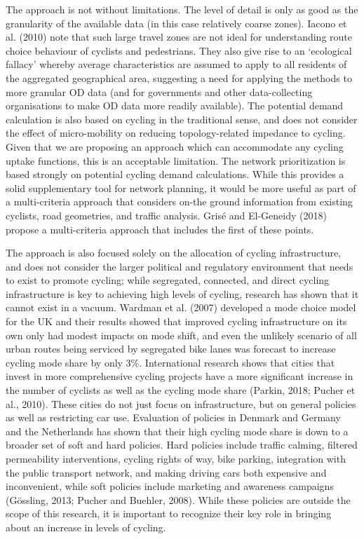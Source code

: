 \documentclass[
]{article}
\begin{document}
The approach is not without limitations.
The level of detail is only as good as the granularity of the available data (in this case relatively coarse zones).
Iacono et al. (2010) note that such large travel zones are not ideal for understanding route choice behaviour of cyclists and pedestrians.
They also give rise to an `ecological fallacy' whereby average characteristics are assumed to apply to all residents of the aggregated geographical area, suggesting a need for applying the methods to more granular OD data (and for governments and other data-collecting organisations to make OD data more readily available).
The potential demand calculation is also based on cycling in the traditional sense, and does not consider the effect of micro-mobility on reducing topology-related impedance to cycling.
Given that we are proposing an approach which can accommodate any cycling uptake functions, this is an acceptable limitation.
The network prioritization is based strongly on potential cycling demand calculations. While this provides a solid supplementary tool for network planning, it would be more useful as part of a multi-criteria approach that considers on-the ground information from existing cyclists, road geometries, and traffic analysis. Grisé and El-Geneidy (2018) propose a multi-criteria approach that includes the first of these points.

The approach is also focused solely on the allocation of cycling infrastructure, and does not consider the larger political and regulatory environment that needs to exist to promote cycling; while segregated, connected, and direct cycling infrastructure is key to achieving high levels of cycling, research has shown that it cannot exist in a vacuum.
Wardman et al. (2007) developed a mode choice model for the UK and their results showed that improved cycling infrastructure on its own only had modest impacts on mode shift, and even the unlikely scenario of all urban routes being serviced by segregated bike lanes was forecast to increase cycling mode share by only 3\%.
International research shows that cities that invest in more comprehensive cycling projects have a more significant increase in the number of cyclists as well as the cycling mode share (Parkin, 2018; Pucher et al., 2010).
These cities do not just focus on infrastructure, but on general policies as well as restricting car use.
Evaluation of policies in Denmark and Germany and the Netherlands has shown that their high cycling mode share is down to a broader set of soft and hard policies.
Hard policies include traffic calming, filtered permeability interventions, cycling rights of way, bike parking, integration with the public transport network, and making driving cars both expensive and inconvenient, while soft policies include marketing and awareness campaigns (Gössling, 2013; Pucher and Buehler, 2008).
While these policies are outside the scope of this research, it is important to recognize their key role in bringing about an increase in levels of cycling.
\end{document}
